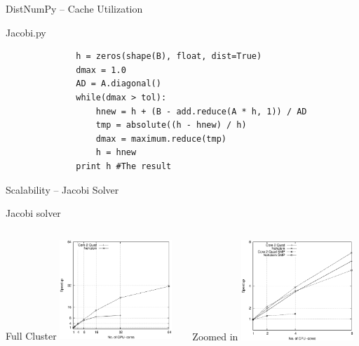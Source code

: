 \documentclass{beamer}
\begin{document}

\begin{frame}[fragile]{DistNumPy -- Cache Utilization}
\begin{center}
Jacobi.py
\end{center}
\begin{scriptsize}
\begin{verbatim}
              h = zeros(shape(B), float, dist=True)
              dmax = 1.0
              AD = A.diagonal()
              while(dmax > tol):
                  hnew = h + (B - add.reduce(A * h, 1)) / AD
                  tmp = absolute((h - hnew) / h)
                  dmax = maximum.reduce(tmp)
                  h = hnew
              print h #The result
\end{verbatim}
\end{scriptsize}
\end{frame}


\begin{frame}{Scalability -- Jacobi Solver}
\begin{center}
Jacobi solver
\end{center}

\begin{columns}
  \begin{column}{0.5\textwidth}
  \begin{center}
    \hspace{21px}Full Cluster
    \includegraphics[width=160px]{../gfx/JacobiStrong}
  \end{center}
  \end{column}
  \begin{column}{0.5\textwidth}
  \begin{center}
    \hspace{23px}Zoomed in
    \includegraphics[width=160px]{../gfx/JacobiStrongSMP}
  \end{center}
  \end{column}
\end{columns}
\end{frame}
\end{document}
